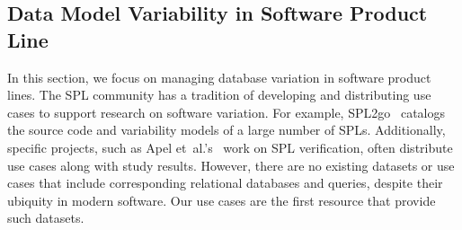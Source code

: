 \subsection{Data Model Variability in Software Product Line}
\label{sec:spl}

In this section, we focus on managing database variation in software product lines.
%
The SPL community has a tradition of developing and distributing use cases
to support research on software variation. For example, SPL2go~\cite{SPL2go}
catalogs the source code and variability models of a large number of SPLs.
Additionally, specific projects, such as Apel
et~al.'s~\cite{apel2013strategies} work on SPL verification, often distribute
use cases along with study results.
%
However, there are no existing datasets or use cases that include
corresponding relational databases and queries, despite their ubiquity in
modern software. Our use cases are the first resource that provide such
datasets. 


